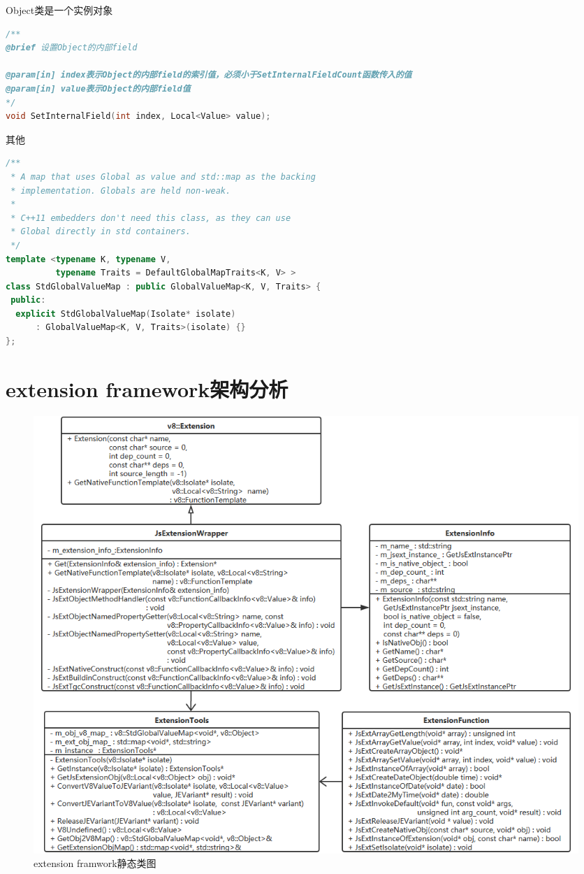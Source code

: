 Object类是一个实例对象
\begin{spacing}{1.0}
\begin{lstlisting}[language={C++}]
/**
@brief 设置Object的内部field

@param[in] index表示Object的内部field的索引值，必须小于SetInternalFieldCount函数传入的值
@param[in] value表示Object的内部field值
*/
void SetInternalField(int index, Local<Value> value);
\end{lstlisting}
\end{spacing}

其他
\begin{spacing}{1.0}
\begin{lstlisting}[language={C++}]
/**
 * A map that uses Global as value and std::map as the backing
 * implementation. Globals are held non-weak.
 *
 * C++11 embedders don't need this class, as they can use
 * Global directly in std containers.
 */
template <typename K, typename V,
          typename Traits = DefaultGlobalMapTraits<K, V> >
class StdGlobalValueMap : public GlobalValueMap<K, V, Traits> {
 public:
  explicit StdGlobalValueMap(Isolate* isolate)
      : GlobalValueMap<K, V, Traits>(isolate) {}
};
\end{lstlisting}
\end{spacing}

\section{extension framework架构分析}
\begin{figure}[H] 
  \centering 
  \includegraphics[width=\textwidth]{image/extension_framework/extension_framework_class.png} 
  \caption{extension framwork静态类图} \label{fig:extension_framework_class} 
\end{figure}

